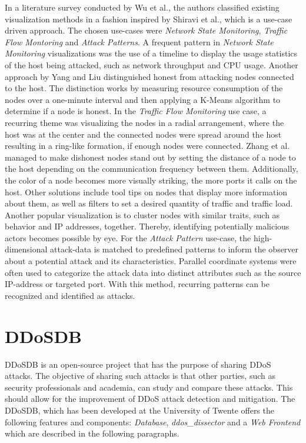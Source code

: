 In a literature survey conducted by Wu et al.\cite{wu}, the authors classified existing visualization methods in a fashion inspired by Shiravi et al.\cite{shiravi}, which is a use-case driven approach. The chosen use-cases were \textit{Network State Monitoring}, \textit{Traffic Flow Montoring} and \textit{Attack Patterns}. A frequent pattern in \textit{Network State Monitoring} visualizations was the use of a timeline to display the usage statistics of the host being attacked, such as network throughput and CPU usage\cite{chen, lee}. Another approach by Yang and Liu\cite{yang} distinguished honest from attacking nodes connected to the host. The distinction works by measuring resource consumption of the nodes over a one-minute interval and then applying a K-Means algorithm to determine if a node is honest. 
In the \textit{Traffic Flow Monitoring} use case, a recurring theme was visualizing the nodes in a radial arrangement\cite{zhangRadial, pearlman, barbosa}, where the host was at the center and the connected nodes were spread around the host resulting in a ring-like formation, if enough nodes were connected. Zhang et al.\cite{zhangRadial} managed to make dishonest nodes stand out by setting the distance of a node to the host depending on the communication frequency between them. Additionally, the color of a node becomes more visually striking, the more ports it calls on the host. Other solutions include tool tips on nodes that display more information about them, as well as filters to set a desired quantity of traffic and traffic load\cite{barbosa}. Another popular visualization is to cluster nodes with similar traits, such as behavior and IP addresses, together\cite{zhangCluster}. Thereby, identifying potentially malicious actors becomes possible by eye.
For the \textit{Attack Pattern} use-case, the high-dimensional attack-data is matched to predefined patterns to inform the observer about a potential attack and its characteristics\cite{wu}. Parallel coordinate systems were often used to categorize the attack data into distinct attributes such as the source IP-address or targeted port\cite{choi, lee, okada}. With this method, recurring patterns can be recognized and identified as attacks.

\section{DDoSDB}\label{ddosdb}
DDoSDB is an open-source project that has the purpose of sharing DDoS attacks. The objective of sharing such attacks is that other parties, such as security professionals and academia, can study and compare these attacks. This should allow for the improvement of DDoS attack detection and mitigation\cite{ddosdb}.
The DDoSDB, which has been developed at the University of Twente offers the following features and components: \emph{Database}, \emph{ddos\_dissector} and a \emph{Web Frontend} which are described in the following paragraphs.

